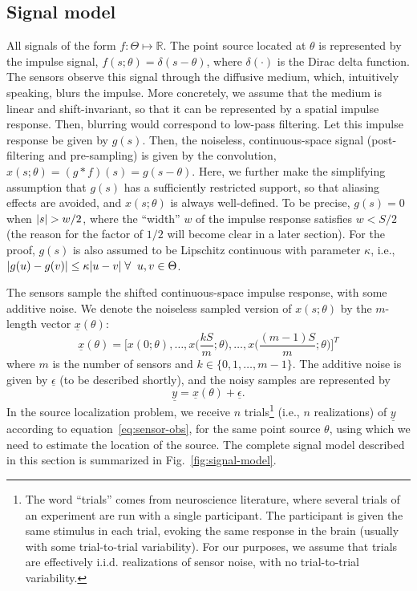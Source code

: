 \documentclass[conference]{IEEEtran}
\providecommand{\v}{}
\renewcommand{\v}[1]{\underline{#1}}
\DeclarePairedDelimiter\abs{\lvert}{\rvert}
\begin{document}
\subsection{Signal model}
\label{sec:signal-model}

All signals of the form $f:\Theta\mapsto\mathbb{R}$.  The point source located at $\theta$
is represented by the impulse signal, $f(s;\theta) = \delta(s - \theta)$, where
$\delta(\cdot)$ is the Dirac delta function.  The sensors observe this signal
through the diffusive medium, which, intuitively speaking, blurs the impulse.
More concretely, we assume that the medium is linear and shift-invariant, so
that it can be represented by a spatial impulse response. Then, blurring would
correspond to low-pass filtering.  Let this impulse response be given by
$g(s)$. Then, the noiseless, continuous-space signal (post-filtering and
pre-sampling) is given by the convolution, $x(s; \theta) = (g*f)(s) = g(s -
\theta)$. Here, we further make the simplifying assumption that $g(s)$ has a
sufficiently restricted support, so that aliasing effects are avoided, and
$x(s; \theta)$ is always well-defined. To be precise, $g(s) = 0$ when $\abs{s}
> w/2$, where the ``width'' $w$ of the impulse response satisfies $w < S / 2$
(the reason for the factor of $1/2$ will become clear in a later section). For
the proof, $g(s)$ is also assumed to be Lipschitz continuous with parameter
$\kappa$, i.e., $\abs{g(u) - g(v)} \leq \kappa \abs{u - v} \; \forall \;\; u, v
\in \Theta$.

The sensors sample the shifted continuous-space impulse response, with some
additive noise. We denote the noiseless sampled version of $x(s; \theta)$ by
the $m$-length vector $\v x(\theta)$:
\begin{equation} \label{eq:sampled-signal}
	\v x(\theta) = \bigg[x(0; \theta), \ldots, x\Big(\frac{kS}{m}; \theta\Big), \ldots, x\Big(\frac{(m-1)S}{m}; \theta\Big)\bigg]^T
\end{equation}
where $m$ is the number of sensors and $k \in \{0, 1, \ldots, m-1\}$. The
additive noise is given by $\v \epsilon$ (to be described shortly), and the
noisy samples are represented by
\begin{equation} \label{eq:sensor-obs}
	\v y = \v x(\theta) + \v \epsilon.
\end{equation}
In the source localization problem, we receive $n$ trials\footnote{The word
``trials'' comes from neuroscience literature, where several trials of an
experiment are run with a single participant. The participant is given the same
stimulus in each trial, evoking the same response in the brain (usually with
some trial-to-trial variability). For our purposes, we assume that trials are
effectively i.i.d. realizations of sensor noise, with no trial-to-trial
variability.} (i.e., $n$ realizations) of $\v y$ according to
equation~\eqref{eq:sensor-obs}, for the same point source $\theta$, using which
we need to estimate the location of the source.
The complete signal model described in this section is summarized in
Fig.~\ref{fig:signal-model}.
\end{document}
